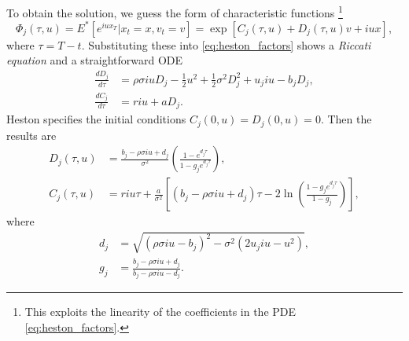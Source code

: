 \documentclass[a4paper,12pt]{article}
\numberwithin{equation}{section}
\theoremstyle{definition}
\theoremstyle{remark}
\begin{document}
To obtain the solution, we guess the form of characteristic functions
\footnote{This exploits the linearity of the coefficients in the 
PDE \eqref{eq:heston_factors}.}
\begin{equation}
    \Phi_{j}(\tau,u)=E^{*}\left[e^{iux_{T}}|x_{t}=x,v_{t}=v\right]
    =\exp[{C_{j}(\tau,u)+D_{j}(\tau,u)v+iux}],
\end{equation}
where $\tau=T-t$. Substituting these into \eqref{eq:heston_factors} 
shows a \textit{Riccati equation} and a straightforward ODE
\begin{equation}
    \begin{split}
        \frac{dD_j}{d\tau}&=\rho\sigma iuD_{j}-\frac{1}{2}u^{2}
        +\frac{1}{2}\sigma^{2}D_{j}^{2}+u_{j}iu-b_{j}D_{j}, \\
        \frac{dC_j}{d\tau}&=riu+aD_{j}.
    \end{split}
\end{equation}
Heston specifies the initial conditions $C_{j}(0,u)=D_{j}(0,u)=0$. 
Then the results are 
\begin{equation}
    \begin{split}
        D_{j}(\tau,u)&=\frac{b_{j}-\rho\sigma iu+d_{j}}{\sigma^{2}}
        \left(\frac{1-e^{d_{j}\tau}}{1-g_{j}e^{d_{j}\tau}}\right), \\
        C_{j}(\tau,u)&=riu\tau+\frac{a}{\sigma^{2}}\left[(b_{j}-
        \rho\sigma iu+d_{j})\tau-2\ln\left(\frac{1-g_{j}e^{d_{j}\tau}}{1-g_{j}}
        \right)\right],
    \end{split}
\end{equation}
where 
\begin{equation}
    \begin{split}
        d_{j}&=\sqrt{(\rho\sigma iu-b_{j})^{2}-\sigma^{2}(2u_{j}iu-u^{2})}, \\
        g_{j}&=\frac{b_{j}-\rho\sigma iu+d_{j}}{b_{j}-\rho\sigma iu-d_{j}}.
    \end{split}
\end{equation}
\end{document}
